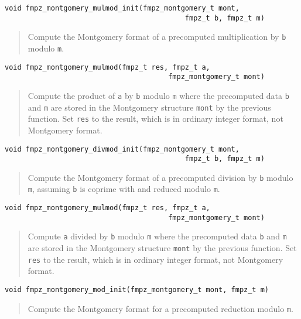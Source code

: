 \documentclass[a4paper,10pt]{article}
\newcommand{\code}{\lstinline}
\begin{document}
\begin{lstlisting}
void fmpz_montgomery_mulmod_init(fmpz_montgomery_t mont, 
                                           fmpz_t b, fmpz_t m) 
\end{lstlisting}
\begin{quote}
Compute the Montgomery format of a precomputed multiplication by \code{b} modulo \code{m}.
\end{quote}

\begin{lstlisting}
void fmpz_montgomery_mulmod(fmpz_t res, fmpz_t a, 
                                       fmpz_montgomery_t mont)
\end{lstlisting}
\begin{quote}
Compute the product of \code{a} by \code{b} modulo \code{m} where the precomputed data \code{b} and \code{m} are stored in the Montgomery structure \code{mont} by the previous function. Set \code{res} to the result, which is in ordinary integer format, not Montgomery format.
\end{quote}

\begin{lstlisting}
void fmpz_montgomery_divmod_init(fmpz_montgomery_t mont, 
                                           fmpz_t b, fmpz_t m) 
\end{lstlisting}
\begin{quote}
Compute the Montgomery format of a precomputed division by \code{b} modulo \code{m}, assuming \code{b} is coprime with and reduced modulo \code{m}.
\end{quote}

\begin{lstlisting}
void fmpz_montgomery_mulmod(fmpz_t res, fmpz_t a, 
                                       fmpz_montgomery_t mont)
\end{lstlisting}
\begin{quote}
Compute \code{a} divided by \code{b} modulo \code{m} where the precomputed data \code{b} and \code{m} are stored in the Montgomery structure \code{mont} by the previous function. Set \code{res} to the result, which is in ordinary integer format, not Montgomery format.
\end{quote}

\begin{lstlisting}
void fmpz_montgomery_mod_init(fmpz_montgomery_t mont, fmpz_t m) 
\end{lstlisting}
\begin{quote}
Compute the Montgomery format for a precomputed reduction modulo \code{m}.
\end{quote}
\end{document}
